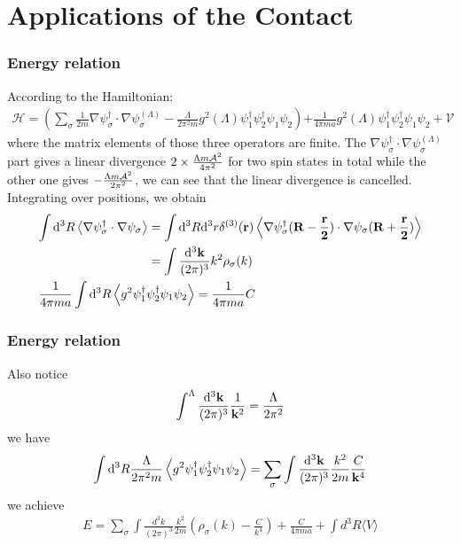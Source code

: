 \section{Applications of the Contact}
\begin{frame}
	\frametitle{Energy relation}

	According to the Hamiltonian:
	\begin{align}
		\mathcal{H} = \left(\sum_{\sigma} \frac {1} {2 m} \nabla \psi_{\sigma}^{\dagger} \cdot \nabla \psi_{\sigma}^{(\Lambda)} - \frac {\Lambda} {2 \pi^{2} m} g^{2}(\Lambda) \psi_{1}^{\dagger} \psi_{2}^{\dagger} \psi_{1} \psi_{2}\right){+ \frac {1} {4 \pi m a} g^{2}(\Lambda) \psi_{1}^{\dagger} \psi_{2}^{\dagger} \psi_{1} \psi_{2} + \mathcal{V}}
	\end{align}
	where the matrix elements of those three operators are finite. The $\nabla \psi_{\sigma}^{\dagger} \cdot \nabla \psi_{\sigma}^{(\Lambda)}$ part gives a linear divergence $2\times\frac{\Lambda  m\mathcal{A}^2}{4 \pi ^2}$ for two spin states in total while the other one gives $-\frac{\Lambda m\mathcal{A}^2}{2\pi^2}$, we can see that the linear divergence is cancelled. Integrating over positions, we obtain
	\begin{align}
		  &
		\begin{aligned}
			\int\dd^3R\expval{\nabla \psi_{\sigma}^{\dagger} \cdot \nabla \psi_{\sigma}} & =\int\dd^3R\dd^3r\delta^{(3)}(\vb{r})\expval{\nabla \psi_{\sigma}^{\dagger}(\vb{R-\frac{r}{2}}) \cdot \nabla \psi_{\sigma}(\vb{R+\frac{r}{2}})} \\& =\int\frac{\dd^3\vb{k}}{(2\pi)^3}k^2\rho_\sigma(k)
		\end{aligned} \\
		  & \frac {1} {4 \pi m a} \int\dd^3R \expval{g^{2}\psi_{1}^{\dagger} \psi_{2}^{\dagger} \psi_{1} \psi_{2}}=\frac {1} {4 \pi m a}C
	\end{align}


\end{frame}
\begin{frame}
	\frametitle{Energy relation}

	Also notice
	\begin{align}
		\int^\Lambda\frac{\dd^3\vb{k}}{(2\pi)^3}\frac{1}{\vb{k}^2}=\frac{\Lambda}{2\pi^2}
	\end{align}
	we have
	\begin{align}
		\int\dd^3R\frac {\Lambda} {2 \pi^{2} m} \expval{g^{2} \psi_{1}^{\dagger} \psi_{2}^{\dagger} \psi_{1} \psi_{2}}=\sum_\sigma\int\frac{\dd^3\vb{k}}{(2\pi)^3}\frac{k^2}{2m}\frac{C}{\vb{k}^4}
	\end{align}
	we achieve
	\begin{align}
		E = \sum_{\sigma} \int \frac {d^{3} k} {(2 \pi)^{3}} \frac {k^{2}} {2 m} \left(\rho_{\sigma} (k) - \frac {C} {k^{4}}\right) + \frac {C} {4 \pi m a}+ \int d^{3} R \langle V \rangle
	\end{align}

\end{frame}

